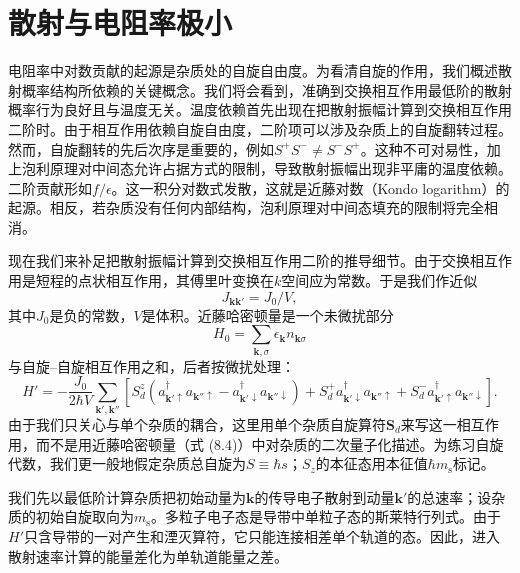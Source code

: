\section{散射与电阻率极小}

电阻率中对数贡献的起源是杂质处的自旋自由度。为看清自旋的作用，我们概述散射概率结构所依赖的关键概念。我们将会看到，准确到交换相互作用最低阶的散射概率行为良好且与温度无关。温度依赖首先出现在把散射振幅计算到交换相互作用二阶时。由于相互作用依赖自旋自由度，二阶项可以涉及杂质上的自旋翻转过程。然而，自旋翻转的先后次序是重要的，例如$S^+S^-\neq S^-S^+$。这种不可对易性，加上泡利原理对中间态允许占据方式的限制，导致散射振幅出现非平庸的温度依赖。二阶贡献形如$f/\epsilon$。这一积分对数式发散，这就是近藤对数（Kondo logarithm）的起源。相反，若杂质没有任何内部结构，泡利原理对中间态填充的限制将完全相消。

现在我们来补足把散射振幅计算到交换相互作用二阶的推导细节。由于交换相互作用是短程的点状相互作用，其傅里叶变换在$k$空间应为常数。于是我们作近似
\begin{equation*}
J_{\mathbf{k}\mathbf{k}'} = J_0/V,
\tag{8.13}
\end{equation*}
其中$J_0$是负的常数，$V$是体积。近藤哈密顿量是一个未微扰部分
\begin{equation*}
H_0 = \sum_{\mathbf{k},\sigma}\epsilon_{\mathbf{k}} n_{\mathbf{k}\sigma}
\tag{8.14}
\end{equation*}
与自旋–自旋相互作用之和，后者按微扰处理：
\begin{equation*}
H' = -\frac{J_0}{2\hbar V}\sum_{\mathbf{k}',\mathbf{k}''}\left[S_d^z\left(a_{\mathbf{k}'\uparrow}^{\dagger}a_{\mathbf{k}''\uparrow}-a_{\mathbf{k}'\downarrow}^{\dagger}a_{\mathbf{k}''\downarrow}\right)+S_d^{+}a_{\mathbf{k}'\downarrow}^{\dagger}a_{\mathbf{k}''\uparrow}+S_d^{-}a_{\mathbf{k}'\uparrow}^{\dagger}a_{\mathbf{k}''\downarrow}\right].
\tag{8.15}
\end{equation*}
由于我们只关心与单个杂质的耦合，这里用单个杂质自旋算符$\mathbf{S}_d$来写这一相互作用，而不是用近藤哈密顿量（式 (8.4)）中对杂质的二次量子化描述。为练习自旋代数，我们更一般地假定杂质总自旋为$S\equiv\hbar s$；$S_z$的本征态用本征值$\hbar m_{\mathrm{s}}$标记。

我们先以最低阶计算杂质把初始动量为$\mathbf{k}$的传导电子散射到动量$\mathbf{k}'$的总速率；设杂质的初始自旋取向为$m_{\mathrm{s}}$。多粒子电子态是导带中单粒子态的斯莱特行列式。由于$H'$只含导带的一对产生和湮灭算符，它只能连接相差单个轨道的态。因此，进入散射速率计算的能量差化为单轨道能量之差。

